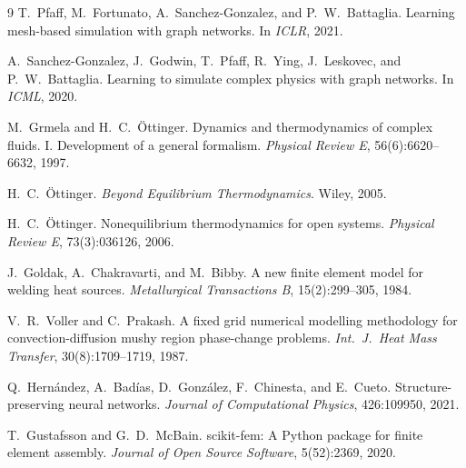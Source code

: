 \documentclass[11pt]{article}
\theoremstyle{definition}
\begin{document}
\begin{thebibliography}{9}
T.~Pfaff, M.~Fortunato, A.~Sanchez-Gonzalez, and P.~W.~Battaglia.
\newblock Learning mesh-based simulation with graph networks.
\newblock In \emph{ICLR}, 2021.

A.~Sanchez-Gonzalez, J.~Godwin, T.~Pfaff, R.~Ying, J.~Leskovec, and P.~W.~Battaglia.
\newblock Learning to simulate complex physics with graph networks.
\newblock In \emph{ICML}, 2020.

M.~Grmela and H.~C.~\"Ottinger.
\newblock Dynamics and thermodynamics of complex fluids. I. Development of a general formalism.
\newblock \emph{Physical Review E}, 56(6):6620--6632, 1997.

H.~C.~\"Ottinger.
\newblock \emph{Beyond Equilibrium Thermodynamics}.
\newblock Wiley, 2005.

H.~C.~\"Ottinger.
\newblock Nonequilibrium thermodynamics for open systems.
\newblock \emph{Physical Review E}, 73(3):036126, 2006.

J.~Goldak, A.~Chakravarti, and M.~Bibby.
\newblock A new finite element model for welding heat sources.
\newblock \emph{Metallurgical Transactions B}, 15(2):299--305, 1984.

V.~R.~Voller and C.~Prakash.
\newblock A fixed grid numerical modelling methodology for convection-diffusion mushy
region phase-change problems.
\newblock \emph{Int.\ J.\ Heat Mass Transfer}, 30(8):1709--1719, 1987.

Q.~Hern\'andez, A.~Bad\'ias, D.~Gonz\'alez, F.~Chinesta, and E.~Cueto.
\newblock Structure-preserving neural networks.
\newblock \emph{Journal of Computational Physics}, 426:109950, 2021.

T.~Gustafsson and G.~D.~McBain.
\newblock scikit-fem: A Python package for finite element assembly.
\newblock \emph{Journal of Open Source Software}, 5(52):2369, 2020.
\end{thebibliography}
\end{document}
